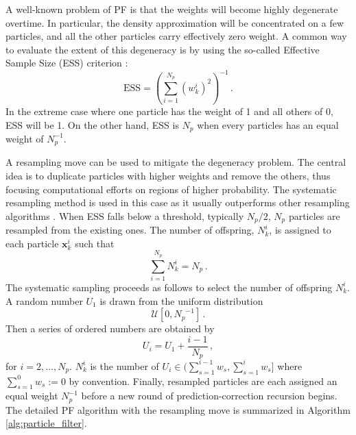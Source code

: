 A well-known problem of PF is that the weights will become highly degenerate overtime. In particular, the density approximation will be concentrated on a few particles, and all the other particles carry effectively zero weight. A common way to evaluate the extent of this degeneracy is by using the so-called Effective Sample Size (ESS) criterion \cite{liu2008monte}:
\begin{equation}
\text{ESS}=\left(\sum_{i=1}^{N_{p}}\left(w_k^{i}\right)^{2}\right)^{-1} \,.
\end{equation}
In the extreme case where one particle has the weight of 1 and all others of 0, ESS will be 1. On the other hand, ESS is $N_p$ when every particles has an equal weight of $N_p^{-1}$.

A resampling move can be used to mitigate the degeneracy problem. The central idea is to duplicate particles with higher weights and remove the others, thus focusing computational efforts on regions of higher probability. The systematic resampling method is used in this case as it usually outperforms other resampling algorithms \cite{doucet2009tutorial}. When ESS falls below a threshold, typically $N_p/2$, $N_p$ particles are resampled from the existing ones. The number of offspring, $N_k^{i}$, is assigned to each particle $\boldsymbol{x}_k^i$ such that 
$$
\sum_{i=1}^{N_p}N_k^{i} = N_p \,.
$$
The systematic sampling proceeds as follows to select the number of offspring $N_k^{i}$. A random number $U_{1}$ is drawn from the uniform distribution 
$$
\mathcal{U}\left[0, {N_p}^{-1}\right] \,.
$$
Then a series of ordered numbers are obtained by 
$$
U_{i}=U_{1}+\frac{i-1}{N_p} \,,
$$
for $i=2, \ldots, N_p$. $N_k^{i}$ is the number of $U_{i} \in(\sum_{s=1}^{i-1} w_{s}, \sum_{s=1}^{i} w_{s}]$ where $\sum_{s=1}^{0} w_{s} := 0$ by convention. Finally, resampled particles are each assigned an equal weight $N_{p}^{-1}$ before a new round of prediction-correction recursion begins. The detailed PF algorithm with the resampling move is summarized in Algorithm \ref{alg:particle_filter}.
